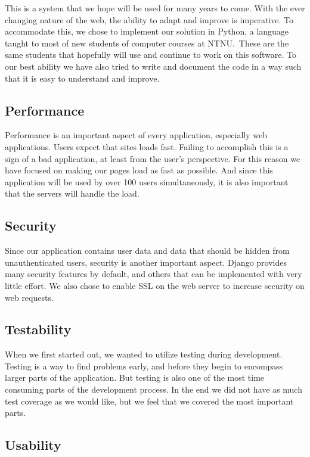 This is a system that we hope will be used for many years to come. With
the ever changing nature of the web, the ability to adapt and improve
is imperative. To accommodate this, we chose to implement our solution
in Python, a language taught to most of new students of computer
courses at NTNU.\ These are the same students that hopefully will use
and continue to work on this software. To our best ability we have also
tried to write and document the code in a way such that it is easy to
understand and improve.

\subsection{Performance}

Performance is an important aspect of every application, especially web
applications. Users expect that sites loads fast. Failing to accomplish
this is a sign of a bad application, at least from the
user's perspective. For this reason we have focused on
making our pages load as fast as possible. And since this application
will be used by over 100 users simultaneously, it is also important
that the servers will handle the load. \ 

\subsection{Security}

Since our application contains user data and data that should be hidden
from unauthenticated users, security is another important aspect.
Django provides many security features by default, and others that can
be implemented with very little effort. We also chose to enable SSL on
the web server to increase security on web requests.

\subsection{Testability}

When we first started out, we wanted to utilize testing during
development. Testing is a way to find problems early, and before they
begin to encompass larger parts of the application. But testing is also
one of the most time consuming parts of the development process. In the
end we did not have as much test coverage as we would like, but we feel
that we covered the most important parts.

\subsection{Usability}

